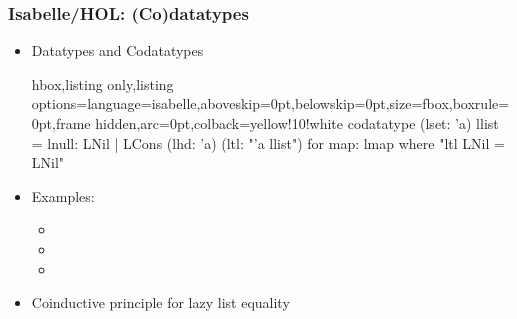 \documentclass[aspectratio=169,10pt]{beamer}
\begin{document}
\begin{frame}[fragile]
  \frametitle{Isabelle/HOL: (Co)datatypes}
  \begin{itemize}
    \item Datatypes and Codatatypes
          \vspace*{-1ex}
          \begin{tcblisting}{hbox,listing only,listing options={language=isabelle,aboveskip=0pt,belowskip=0pt},size=fbox,boxrule=0pt,frame hidden,arc=0pt,colback=yellow!10!white}
codatatype (lset: 'a) llist = lnull: LNil | LCons (lhd: 'a) (ltl: "'a llist")
for map: lmap where "ltl LNil = LNil"
          \end{tcblisting}
          \vspace*{-1ex}
    \item Examples:
          \begin{itemize}
            \item {}
            \item {}
            \item {}
          \end{itemize}
          \vspace*{-1ex}
          \pause
    \item Coinductive principle for lazy list equality
  \end{itemize}
\end{frame}
\end{document}
